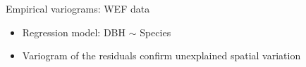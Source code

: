 \documentclass[xcolor=pdftex,dvipsnames,table,numbers,hyperref={pdfpagelabels=false},compress]{beamer}
\newcommand{\red}[1]{{\color{Red} #1}}
\begin{document}
\begin{frame}{Empirical variograms: WEF data}
	\begin{itemize}
	\item Regression model: DBH $\sim$ Species
	\end{itemize}
	\begin{figure}
\end{figure}
	\begin{itemize}
		\item Variogram of the residuals confirm \red{unexplained spatial variation}
	\end{itemize}
\end{frame}
\end{document}

